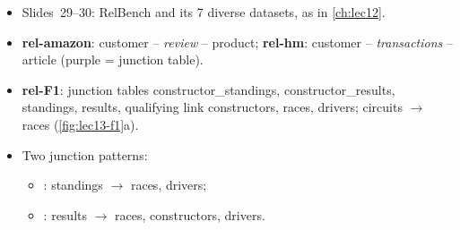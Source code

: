 \begin{itemize}
  \item Slides~29--30: RelBench and its 7 diverse datasets, as in \cref{ch:lec12}.
  \item \textbf{rel-amazon}: customer -- \emph{review} -- product; \textbf{rel-hm}:
    customer -- \emph{transactions} -- article (purple = junction table).
  \item \textbf{rel-F1}: junction tables constructor\_standings, constructor\_results,
    standings, results, qualifying link constructors, races, drivers; circuits $\to$
    races (\cref{fig:lec13-f1}a).
  \item Two junction patterns:
    \begin{itemize}
      \item {}: standings $\to$ races, drivers;
      \item {}: results $\to$ races, constructors, drivers.
    \end{itemize}
\end{itemize}

